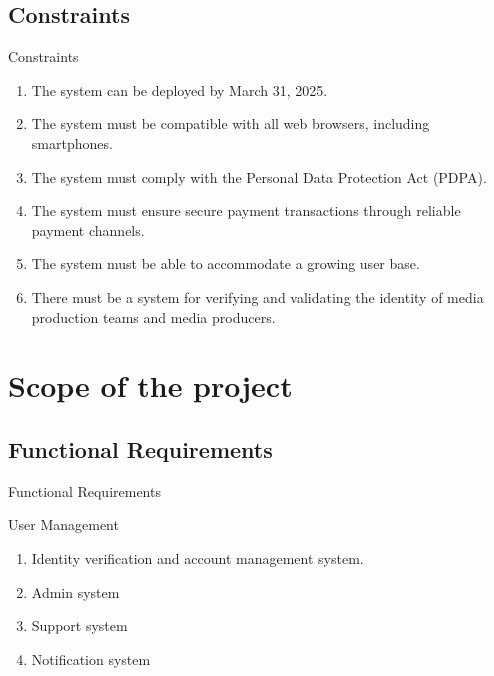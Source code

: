 \documentclass[aspectratio=169]{beamer}
\begin{document}
\subsection{Constraints}
\begin{frame}{Constraints}
    \begin{enumerate}
        \item The system can be deployed by March 31, 2025.
        \item The system must be compatible with all web browsers, including smartphones.
        \item The system must comply with the Personal Data Protection Act (PDPA).
        \item The system must ensure secure payment transactions through reliable payment channels.
        \item The system must be able to accommodate a growing user base.
        \item There must be a system for verifying and validating the identity of media production teams and media producers.
    \end{enumerate}
\end{frame}

\section{Scope of the project}
\subsection{Functional Requirements}

\begin{frame}{Functional Requirements}
    \begin{alertblock}{User Management}
        \begin{enumerate}
            \item Identity verification and account management system.
            \item Admin system
            \item Support system
            \item Notification system
        \end{enumerate}
    \end{alertblock}

\end{frame}
\end{document}
